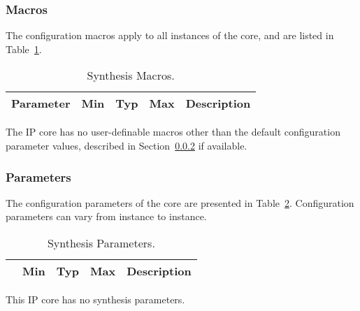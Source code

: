 \subsubsection{Macros}

\ifdefined\SM

The configuration macros apply to all instances of the core, and are listed in
Table~\ref{tab:sm}.

\begin{table}[h]
  \centering
    \begin{tabularx}{\textwidth}{ | c | c | c | c | X | }
    \hline
    \rowcolor{iob-green}
    {\bf Parameter} & {\bf Min} & {\bf Typ} & {\bf Max} & {\bf Description} \\\hline

    

    \end{tabularx}
  \caption{Synthesis Macros.}
  \label{tab:sm}
\end{table}

\noindent

\else
The IP core has no user-definable macros other than the default configuration parameter values, described in Section~\ref{sec:cp} if available.
\fi


\subsubsection{Parameters}
\label{sec:cp}
\ifdefined\SP

The configuration parameters of the core are presented in
Table~\ref{tab:sp}. Configuration parameters can vary from instance to instance.

\begin{table}[p]
  \centering
    \begin{tabular}{|l|c|c|c|p{9cm}|}
    \hline
    \rowcolor{iob-green}
    \multicolumn{1}{|c}{\bf Parameter} & \multicolumn{1}{|c|}{\bf Min} & \multicolumn{1}{c|}{\bf Typ} & \multicolumn{1}{c|}{\bf Max} & \multicolumn{1}{c|}{\bf Description}  \\ \hline \hline

    

    \end{tabular}
    
\caption{Synthesis Parameters.}
  \label{tab:sp}
\end{table}

\else

This IP core has no synthesis parameters.

\fi
